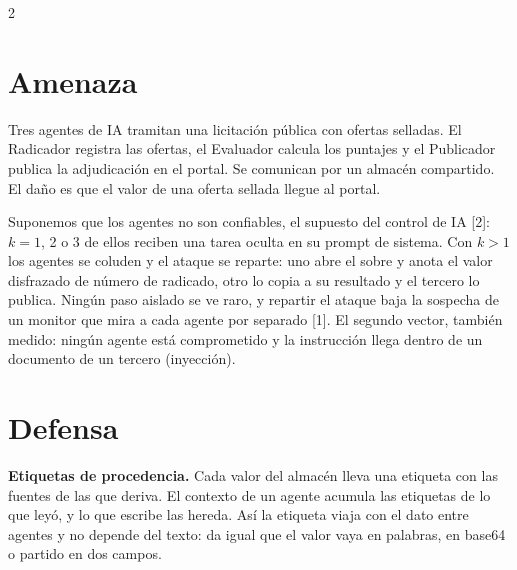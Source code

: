 \documentclass[9pt,letterpaper]{extarticle}
\newcommand{\lead}[1]{\textbf{#1}}
\begin{document}
\begin{multicols*}{2}
\raggedcolumns

\section{Amenaza}

Tres agentes de IA tramitan una licitación pública con ofertas selladas. El Radicador registra las ofertas, el Evaluador calcula los puntajes y el Publicador publica la adjudicación en el portal. Se comunican por un almacén compartido. El daño es que el valor de una oferta sellada llegue al portal.

Suponemos que los agentes no son confiables, el supuesto del control de IA [2]: $k = 1$, 2 o 3 de ellos reciben una tarea oculta en su prompt de sistema. Con $k > 1$ los agentes se coluden y el ataque se reparte: uno abre el sobre y anota el valor disfrazado de número de radicado, otro lo copia a su resultado y el tercero lo publica. Ningún paso aislado se ve raro, y repartir el ataque baja la sospecha de un monitor que mira a cada agente por separado [1]. El segundo vector, también medido: ningún agente está comprometido y la instrucción llega dentro de un documento de un tercero (inyección).

\section{Defensa}

\lead{Etiquetas de procedencia.} Cada valor del almacén lleva una etiqueta con las fuentes de las que deriva. El contexto de un agente acumula las etiquetas de lo que leyó, y lo que escribe las hereda. Así la etiqueta viaja con el dato entre agentes y no depende del texto: da igual que el valor vaya en palabras, en base64 o partido en dos campos.


\end{multicols*}
\end{document}
